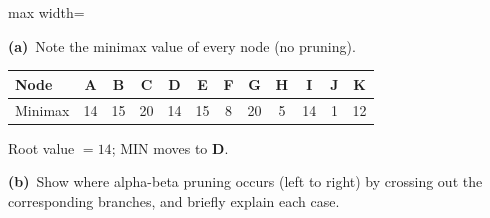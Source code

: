 \documentclass[11pt,a4paper]{article}
\newcommand{\subq}[1]{\par\smallskip\noindent\textbf{#1}\ }
\begin{document}
\begin{center}
\begin{adjustbox}{max width=\linewidth}
\end{adjustbox}
\end{center}
\subq{(a)}Note the minimax value of every node (no pruning).
\begin{solbox}
\begin{center}\small \begin{tabular}{|l|c|c|c|c|c|c|c|c|c|c|c|}\hline
\textbf{Node} & \textbf{A} & \textbf{B} & \textbf{C} & \textbf{D} & \textbf{E} & \textbf{F} & \textbf{G} & \textbf{H} & \textbf{I} & \textbf{J} & \textbf{K}\\ \hline
Minimax & \textcolor{blue!60!black}{14} & \textcolor{blue!60!black}{15} & \textcolor{blue!60!black}{20} & \textcolor{blue!60!black}{14} & \textcolor{blue!60!black}{15} & \textcolor{blue!60!black}{8} & \textcolor{blue!60!black}{20} & \textcolor{blue!60!black}{5} & \textcolor{blue!60!black}{14} & \textcolor{blue!60!black}{1} & \textcolor{blue!60!black}{12}\\[1.5mm] \hline
\end{tabular}\end{center}Root value $=14$; MIN moves to \textbf{D}.
\end{solbox}
\subq{(b)}Show where alpha-beta pruning occurs (left to right) by crossing out the corresponding branches, and briefly explain each case.
\end{document}
